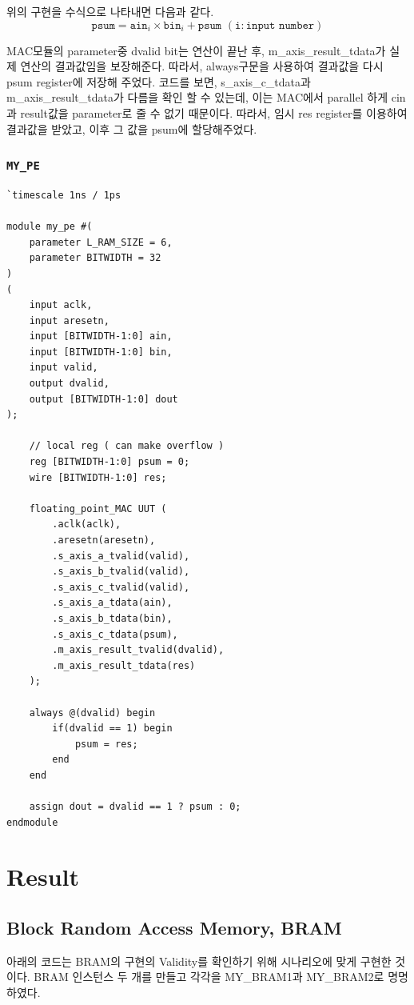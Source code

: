 \documentclass{article}
\begin{document}
위의 구현을 수식으로 나타내면 다음과 같다. 
\begin{equation}
\texttt{psum} = \texttt{ain}_i \times \texttt{bin}_i + \texttt{psum  }(\texttt{i} : \texttt{input number}) 
\end{equation}

MAC모듈의 parameter중 dvalid bit는 연산이 끝난 후, m\_axis\_result\_tdata가 실제 연산의 결과값임을 보장해준다. 따라서, always구문을 사용하여 결과값을 다시 psum register에 저장해 주었다. 코드를 보면, s\_axis\_c\_tdata과 m\_axis\_result\_tdata가 다름을 확인 할 수 있는데, 이는 MAC에서 parallel 하게 cin과 result값을 parameter로 줄 수 없기 때문이다. 따라서, 임시 res register를 이용하여 결과값을 받았고, 이후 그 값을 psum에 할당해주었다.

\newpage
\subsubsection*{\texttt{MY\_PE}}
\begin{lstlisting}[style={verilog-style}]
`timescale 1ns / 1ps

module my_pe #(
    parameter L_RAM_SIZE = 6,
    parameter BITWIDTH = 32
)
(
    input aclk,
    input aresetn,
    input [BITWIDTH-1:0] ain,
    input [BITWIDTH-1:0] bin,
    input valid,
    output dvalid,
    output [BITWIDTH-1:0] dout
);

    // local reg ( can make overflow )
    reg [BITWIDTH-1:0] psum = 0;
    wire [BITWIDTH-1:0] res;
    
    floating_point_MAC UUT (
        .aclk(aclk),
        .aresetn(aresetn),
        .s_axis_a_tvalid(valid),
        .s_axis_b_tvalid(valid),
        .s_axis_c_tvalid(valid),
        .s_axis_a_tdata(ain),
        .s_axis_b_tdata(bin),
        .s_axis_c_tdata(psum),
        .m_axis_result_tvalid(dvalid), 
        .m_axis_result_tdata(res)
    );
  
    always @(dvalid) begin
        if(dvalid == 1) begin
            psum = res;
        end
    end
    
    assign dout = dvalid == 1 ? psum : 0;
endmodule
\end{lstlisting}

\newpage
\section{Result}

\subsection{Block Random Access Memory, BRAM}
아래의 코드는 BRAM의 구현의 Validity를 확인하기 위해 시나리오에 맞게 구현한 것이다. BRAM 인스턴스 두 개를 만들고 각각을 MY\_BRAM1과 MY\_BRAM2로 명명하였다. 
\end{document}
